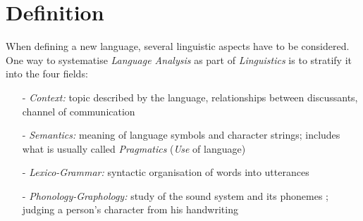 %
%
%
%
%
%
%

\section{Definition}
\label{definition_heading}

When defining a new language, several linguistic aspects have to be considered.
One way to systematise \emph{Language Analysis} as part of \emph{Linguistics}
is to stratify it \cite{odonnell} into the four fields:

\begin{itemize}
    \item[-] \emph{Context:} topic described by the language, relationships
        between discussants, channel of communication
    \item[-] \emph{Semantics:} meaning of language symbols and character strings;
        includes what is usually called \emph{Pragmatics} (\emph{Use} of language)
    \item[-] \emph{Lexico-Grammar:} syntactic organisation of words into utterances
    \item[-] \emph{Phonology-Graphology:} study of the sound system and its
        phonemes \cite{wordnet}; judging a person's character from his
        handwriting \cite{websters}
\end{itemize}

